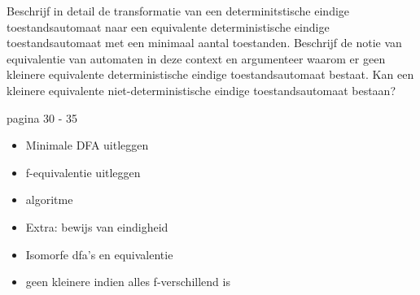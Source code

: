 \begin{question}
Beschrijf in detail de transformatie van een determinitstische eindige toestandsautomaat naar een equivalente deterministische eindige toestandsautomaat met een minimaal aantal toestanden. Beschrijf de notie van equivalentie van automaten in deze context en argumenteer waarom er geen kleinere equivalente deterministische eindige toestandsautomaat bestaat. Kan een kleinere equivalente niet-deterministische eindige toestandsautomaat bestaan?
\end{question}

pagina 30 - 35
\begin{itemize}
	\item Minimale DFA uitleggen
	\item f-equivalentie uitleggen
	\item algoritme
	\item Extra: bewijs van eindigheid
	\item Isomorfe dfa's en equivalentie
	\item geen kleinere indien alles f-verschillend is
\end{itemize} 
